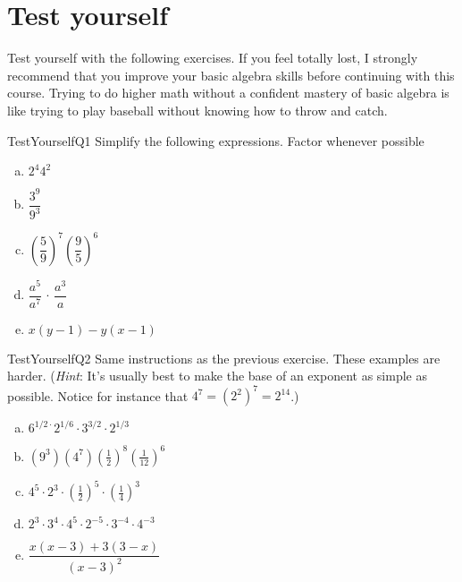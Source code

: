 \section{Test yourself}
\label{sec:Preliminaries:TestYourself}
Test yourself with the following exercises. If you feel totally lost, I strongly recommend that you improve your basic algebra skills before continuing with this course. Trying to do higher math without a confident mastery of basic algebra is like trying to play baseball without knowing how to throw and catch.

\begin{exercise}{TestYourselfQ1}
Simplify the following expressions. Factor whenever possible
\begin{multicols}{2}
\begin{enumerate}[(a)]
\item
$ 2^4 4^2$
\item
$ \dfrac{3^9}{9^3}$
\item
$\left( \dfrac{5}{9} \right)^7 \left( \dfrac{9}{5} \right)^6$
\item
$\dfrac{a^5}{a^7} \, \cdot \, \dfrac{a^3}{a}$
\item
$x(y-1) - y(x-1)$
\end{enumerate}
\end{multicols}
\end{exercise}



\begin{exercise}{TestYourselfQ2}
Same instructions as the previous exercise. These examples are  harder. (\emph{Hint}: It's usually best to make the base of an exponent as simple as possible. Notice for instance that $4^7 = (2^2)^7 = 2^{14}$.)
\begin{multicols}{2}
\begin{enumerate}[(a)]
\item
$6^{1/2\cdot}2^{1/6}\cdot3^{3/2}\cdot2^{1/3}$
\item
$(9^3)(4^7)\left(\frac{1}{2}\right)^8\left(\frac{1}{12}\right)^6$
\item
$4^5 \cdot 2^3 \cdot \left(\frac{1}{2}\right)^5 \cdot \left( \frac{1}{4} \right) ^3$
\item
$2^3 \cdot 3^4 \cdot 4^5 \cdot 2^{-5} \cdot 3^{-4} \cdot 4^{-3}$
\item
$\dfrac{x(x-3)+3(3-x)}{(x-3)^2}$
\end{enumerate}
\end{multicols}
\end{exercise}


